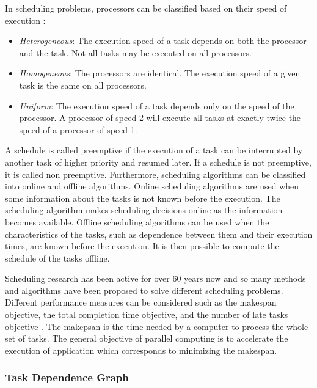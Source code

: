 In scheduling problems, processors can be classified based on their speed of execution \cite{davis:2011}:

\begin{itemize}
\item \textit{Heterogeneous}: The execution speed of a task depends on both the processor and the task. Not all tasks may be executed on all processors.
\item \textit{Homogeneous}: The processors are identical. The execution speed of a given task is the same on all processors.
\item \textit{Uniform}: The execution speed of a task depends only on the speed of the processor. A processor of speed 2 will execute all tasks at exactly twice the speed of a processor of speed 1.
\end{itemize}

A schedule is called preemptive if the execution of a task can be interrupted by another task of higher priority and resumed later. If a schedule is not preemptive, it is called non preemptive. Furthermore, scheduling algorithms can be classified into online and offline algorithms. Online scheduling algorithms are used when some information about the tasks is not known before the execution. The scheduling algorithm makes scheduling decisions online as the information becomes available. Offline scheduling algorithms can be used when the characteristics of the tasks, such as dependence between them and their execution times, are known before the execution. It is then possible to compute the schedule of the tasks offline.

Scheduling research has been active for over 60 years now and so many methods and algorithms have been proposed to solve different scheduling problems. Different performance measures can be considered such as the makespan objective, the total completion time objective, and the number of late tasks objective \cite{leung:2004}. The makepsan is the time needed by a computer to process the whole set of tasks. The general objective of parallel computing is to accelerate the execution of application which corresponds to minimizing the makespan.

\subsubsection{Task Dependence Graph}

